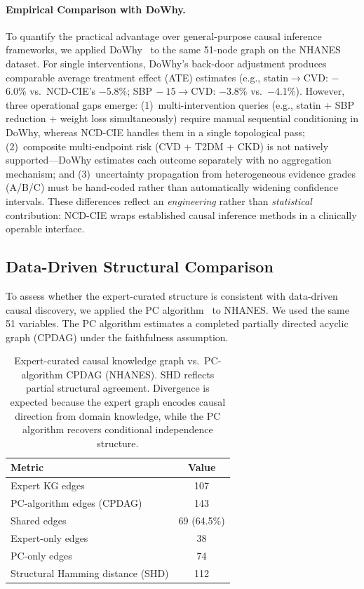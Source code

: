 \documentclass[runningheads]{llncs}
\begin{document}
\paragraph{Empirical Comparison with DoWhy.}
To quantify the practical advantage over general-purpose causal
inference frameworks, we applied DoWhy~\cite{sharma2020dowhy} to the
same 51-node graph on the NHANES dataset.
For single interventions, DoWhy's back-door adjustment produces
comparable average treatment effect (ATE) estimates
(e.g., statin$\to$CVD: $-$6.0\% vs.\ NCD-CIE's $-$5.8\%;
SBP$\,-15\to$CVD: $-$3.8\% vs.\ $-$4.1\%).
However, three operational gaps emerge:
(1)~multi-intervention queries (e.g., statin + SBP reduction + weight
loss simultaneously) require manual sequential conditioning in DoWhy,
whereas NCD-CIE handles them in a single topological pass;
(2)~composite multi-endpoint risk (CVD + T2DM + CKD) is not
natively supported---DoWhy estimates each outcome separately with no
aggregation mechanism; and
(3)~uncertainty propagation from heterogeneous evidence grades
(A/B/C) must be hand-coded rather than automatically widening
confidence intervals.
These differences reflect an \emph{engineering} rather than
\emph{statistical} contribution: NCD-CIE wraps established causal
inference methods in a clinically operable interface.

\subsection{Data-Driven Structural Comparison}\label{sec:pcalg}

To assess whether the expert-curated structure is consistent with
data-driven causal discovery, we applied the PC
algorithm~\cite{spirtes2000causation} to NHANES.
We used the same 51 variables.
The PC algorithm estimates a completed partially directed acyclic
graph (CPDAG) under the faithfulness assumption.

\renewcommand{\arraystretch}{1.2}
\begin{table}[t]
\centering
\caption{Expert-curated causal knowledge graph vs.\ PC-algorithm
CPDAG (NHANES).
SHD reflects partial structural agreement.
Divergence is expected because the expert graph encodes causal
direction from domain knowledge, while the PC algorithm recovers
conditional independence structure.}\label{tab:pcalg}
\small
\begin{tabular}{@{}lc@{}}
\toprule
\textbf{Metric} & \textbf{Value} \\
\midrule
Expert KG edges                     & 107 \\
PC-algorithm edges (CPDAG)          & 143 \\
Shared edges                        & 69 (64.5\%) \\
Expert-only edges                   & 38 \\
PC-only edges                       & 74 \\
Structural Hamming distance (SHD)   & 112 \\
\bottomrule
\end{tabular}
\end{table}
\renewcommand{\arraystretch}{1.0}
\end{document}
